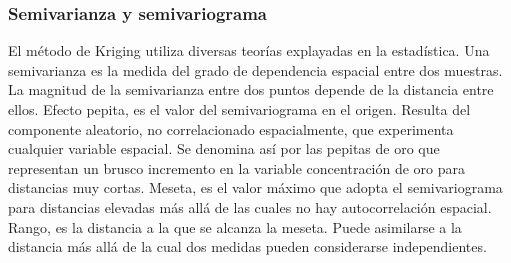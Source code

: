 \subsubsection{Semivarianza y semivariograma}
El método de Kriging utiliza diversas teorías explayadas en la estadística.
Una semivarianza es la medida del grado de dependencia espacial entre dos
muestras. La magnitud de la semivarianza entre dos puntos depende de la
distancia entre ellos. Efecto pepita,  es el valor del semivariograma en
el origen. Resulta del componente aleatorio, no correlacionado espacialmente,
que experimenta cualquier variable espacial. Se denomina así por las pepitas
de oro que representan un brusco incremento en la variable concentración de
oro para distancias muy cortas.
Meseta, es el valor máximo que adopta el semivariograma para distancias
elevadas más allá de las cuales no hay autocorrelación espacial.
Rango, es la distancia a la que se alcanza la meseta. Puede asimilarse a
la distancia más allá de la cual dos medidas pueden considerarse independientes.
